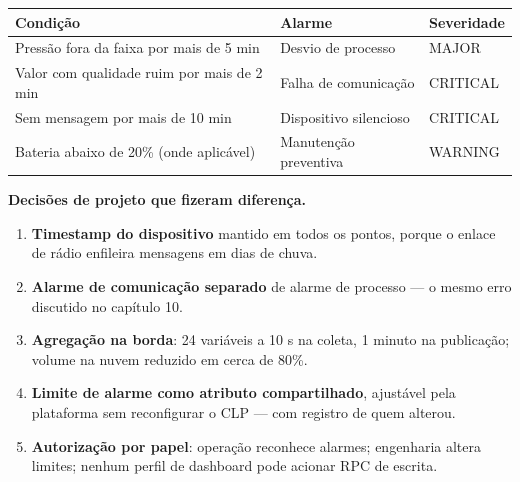 \begin{longtable}[]{@{}
  >{\raggedright\arraybackslash}p{}
  >{\raggedright\arraybackslash}p{}
  >{\raggedright\arraybackslash}p{}@{}}
\toprule\noalign{}
\begin{minipage}[b]{\linewidth}\raggedright
Condição
\end{minipage} & \begin{minipage}[b]{\linewidth}\raggedright
Alarme
\end{minipage} & \begin{minipage}[b]{\linewidth}\raggedright
Severidade
\end{minipage} \\
\midrule\noalign{}
\endhead
\bottomrule\noalign{}
\endlastfoot
Pressão fora da faixa por mais de 5 min & Desvio de processo & MAJOR \\
Valor com qualidade ruim por mais de 2 min & Falha de comunicação & CRITICAL \\
Sem mensagem por mais de 10 min & Dispositivo silencioso & CRITICAL \\
Bateria abaixo de 20\% (onde aplicável) & Manutenção preventiva & WARNING \\
\end{longtable}

\textbf{Decisões de projeto que fizeram diferença.}

\begin{enumerate}
\def\labelenumi{\arabic{enumi}.}
\tightlist
\item
  \textbf{Timestamp do dispositivo} mantido em todos os pontos, porque o enlace de rádio enfileira mensagens em dias de chuva.
\item
  \textbf{Alarme de comunicação separado} de alarme de processo --- o mesmo erro discutido no capítulo 10.
\item
  \textbf{Agregação na borda}: 24 variáveis a 10 s na coleta, 1 minuto na publicação; volume na nuvem reduzido em cerca de 80\%.
\item
  \textbf{Limite de alarme como atributo compartilhado}, ajustável pela plataforma sem reconfigurar o CLP --- com registro de quem alterou.
\item
  \textbf{Autorização por papel}: operação reconhece alarmes; engenharia altera limites; nenhum perfil de dashboard pode acionar RPC de escrita.
\end{enumerate}

